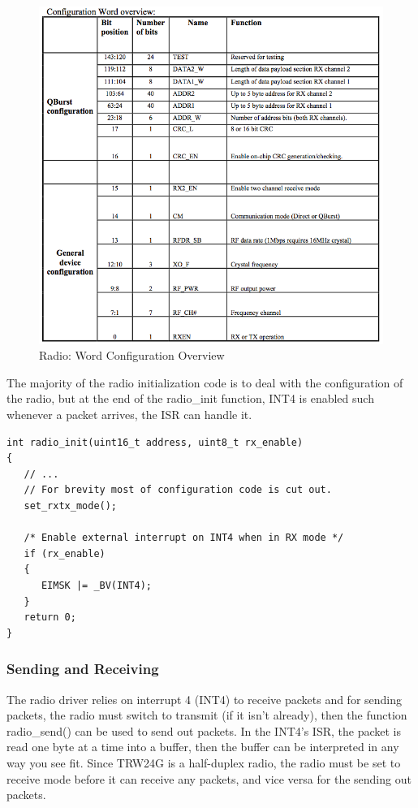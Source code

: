 \begin{figure}[tpb]
  \begin{center}
    \includegraphics[width=125mm]{imageSources/radioConfigOverview.png}
  \end{center}
  \caption{Radio: Word Configuration Overview} 
  \label{radioConfigOverview}
\end{figure}

The majority of the radio initialization code is to deal with the configuration of the radio, but at the end of the radio\_init function, INT4 is enabled such whenever a packet arrives, the ISR can handle it.

\begin{lstlisting}
int radio_init(uint16_t address, uint8_t rx_enable)
{
   // ...
   // For brevity most of configuration code is cut out.
   set_rxtx_mode();

   /* Enable external interrupt on INT4 when in RX mode */
   if (rx_enable)
   {
      EIMSK |= _BV(INT4);
   }
   return 0;
}
\end{lstlisting}

\subsubsection{Sending and Receiving}
The radio driver relies on interrupt 4 (INT4) to receive packets and for sending packets, the radio must switch to transmit (if it isn't already), then the function radio\_send() can be used to send out packets. In the INT4's ISR, the packet is read one byte at a time into a buffer, then the buffer can be interpreted in any way you see fit. Since TRW24G is a half-duplex radio, the radio must be set to receive mode before it can receive any packets, and vice versa for the sending out packets.

